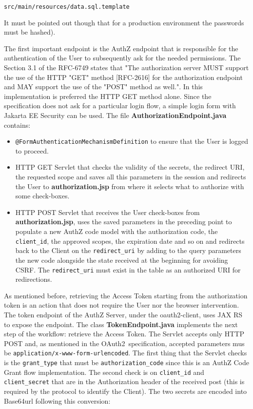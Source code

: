 \documentclass[a4paper,12pt]{article}
\def\oauth{OAuth2\xspace}
\def\rfc#1{RFC-#1\xspace}
\begin{document}
\quad \texttt{src/main/resources/data.sql.template}

It must be pointed out though that for a production environment the passwords must be hashed). 

The first important endpoint is the AuthZ endpoint that is responsible for the authentication of the User to subsequently ask for the needed permissions. The Section 3.1 of the \rfc{6749} states that "The authorization server MUST support the use of the HTTP "GET" method [\rfc{2616}] for the authorization endpoint and MAY support the use of the "POST" method as well.". In this implementation is preferred the HTTP GET method alone. Since the specification does not ask for a particular login flow, a simple login form with Jakarta EE Security can be used. The file \textbf{AuthorizationEndpoint.java} contains:

\begin{itemize}
    \item \texttt{@FormAuthenticationMechanismDefinition} to ensure that the User is logged to proceed.
    \item HTTP GET Servlet that checks the validity of the secrets, the redirect URI, the requested scope and saves all this parameters in the session and redirects the User to \textbf{authorization.jsp} from where it selects what to authorize with some check-boxes.
    \item HTTP POST Servlet that receives the User check-boxes from \textbf{authorization.jsp}, uses the saved parameters in the preceding point to populate a new AuthZ code model with the authorization code, the \texttt{client\_id}, the approved scopes, the expiration date and so on and redirects back to the Client on the \texttt{redirect\_uri} by adding to the query parameters the new code alongside the state received at the beginning for avoiding CSRF. The \texttt{redirect\_uri} must exist in the table as an authorized URI for redirections.
\end{itemize}

As mentioned before, retrieving the Access Token starting from the authorization token is an action that does not require the User nor the browser intervention. The token endpoint of the AuthZ Server, under the oauth2-client, uses JAX RS to expose the endpoint. The class \textbf{TokenEndpoint.java} implements the next step of the workflow: retrieve the Access Token. The Servlet accepts only HTTP POST and, as mentioned in the \oauth\ specification, accepted parameters mus be \texttt{application/x-www-form-urlencoded}. The first thing that the Servlet checks is the \texttt{grant\_type} that must be \texttt{authorization\_code} since this is an AuthZ Code Grant flow implementation. The second check is on \texttt{client\_id} and \texttt{client\_secret} that are in the Authorization header of the received post (this is required by the protocol to identify the Client). The two secrets are encoded into Base64url following this conversion:
\end{document}
